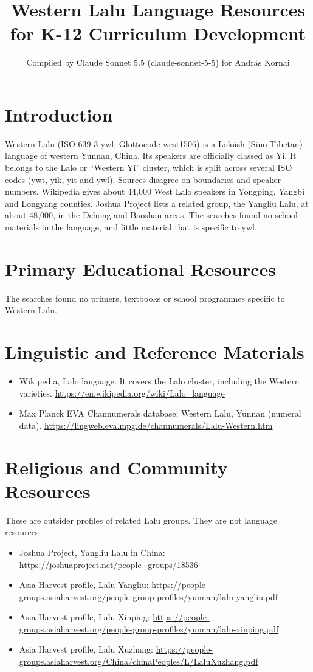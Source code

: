 \documentclass[12pt]{article}
\title{Western Lalu Language Resources for K-12 Curriculum Development}
\author{Compiled by Claude Sonnet 5.5 (claude-sonnet-5-5) for Andr\'as Kornai}
\date{}
\begin{document}
\maketitle

\section{Introduction}
Western Lalu (ISO 639-3 ywl; Glottocode west1506) is a Loloish (Sino-Tibetan) language of western Yunnan, China. Its speakers are officially classed as Yi. It belongs to the Lalo or ``Western Yi'' cluster, which is split across several ISO codes (ywt, yik, yit and ywl). Sources disagree on boundaries and speaker numbers. Wikipedia gives about 44,000 West Lalo speakers in Yongping, Yangbi and Longyang counties. Joshua Project lists a related group, the Yangliu Lalu, at about 48,000, in the Dehong and Baoshan areas. The searches found no school materials in the language, and little material that is specific to ywl.

\section{Primary Educational Resources}
The searches found no primers, textbooks or school programmes specific to Western Lalu.

\section{Linguistic and Reference Materials}
\begin{itemize}
\item Wikipedia, Lalo language. It covers the Lalo cluster, including the Western varieties. \url{https://en.wikipedia.org/wiki/Lalo_language}
\item Max Planck EVA Channumerals database: Western Lalu, Yunnan (numeral data). \url{https://lingweb.eva.mpg.de/channumerals/Lalu-Western.htm}
\end{itemize}

\section{Religious and Community Resources}
These are outsider profiles of related Lalu groups. They are not language resources.
\begin{itemize}
\item Joshua Project, Yangliu Lalu in China: \url{https://joshuaproject.net/people_groups/18536}
\item Asia Harvest profile, Lalu Yangliu: \url{https://people-groups.asiaharvest.org/people-group-profiles/yunnan/lalu-yangliu.pdf}
\item Asia Harvest profile, Lalu Xinping: \url{https://people-groups.asiaharvest.org/people-group-profiles/yunnan/lalu-xinping.pdf}
\item Asia Harvest profile, Lalu Xuzhang: \url{https://people-groups.asiaharvest.org/China/chinaPeoples/L/LaluXuzhang.pdf}
\end{itemize}
\end{document}
